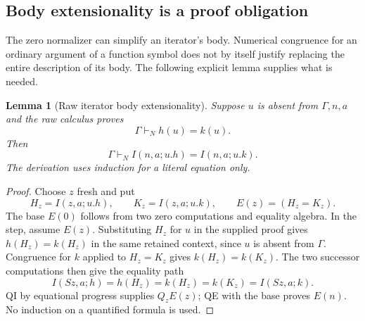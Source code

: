 \documentclass[11pt,a4paper]{article}
\newtheorem{lemma}[theorem]{Lemma}
\theoremstyle{definition}
\begin{document}
\subsection{Body extensionality is a proof obligation}

The zero normalizer can simplify an iterator's body.  Numerical
congruence for an ordinary argument of a function symbol does not by
itself justify replacing the entire description of its body.  The
following explicit lemma supplies what is needed.

\begin{lemma}[Raw iterator body extensionality]\label{zeroI:body}
Suppose $u$ is absent from $\Gamma,n,a$ and the raw calculus proves
\[
 \Gamma\vdash_N h(u)=k(u).
\]
Then
\[
 \Gamma\vdash_N I(n,a;u.h)=I(n,a;u.k).
\]
The derivation uses induction for a literal equation only.
\end{lemma}
\begin{proof}
Choose $z$ fresh and put
\[
 H_z=I(z,a;u.h),\qquad K_z=I(z,a;u.k),\qquad E(z)=(H_z=K_z).
\]
The base $E(0)$ follows from two zero computations and equality algebra.
In the step, assume $E(z)$.  Substituting $H_z$ for $u$ in the supplied
proof gives $h(H_z)=k(H_z)$ in the same retained context, since $u$ is
absent from $\Gamma$.  Congruence for $k$ applied to $H_z=K_z$ gives
$k(H_z)=k(K_z)$.  The two successor computations then give the equality
path
\[
 I(Sz,a;h)=h(H_z)=k(H_z)=k(K_z)=I(Sz,a;k).
\]
QI by equational progress supplies $Q_zE(z)$; QE with the base proves
$E(n)$.  No induction on a quantified formula is used.
\end{proof}
\end{document}

